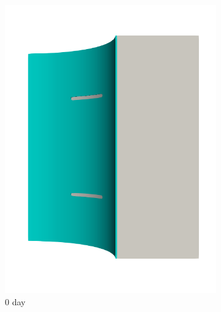 \begin{figure}[!htb]
  \begin{subfigure}[b]{0.2\textwidth}
    \centering
    \includegraphics[width=\textwidth]{Chapter5/figures/spallation/seed_c_1}
    \caption{0 day}
  \end{subfigure}
  \begin{subfigure}[b]{0.2\textwidth}
    \centering

\end{subfigure}
\end{figure}
